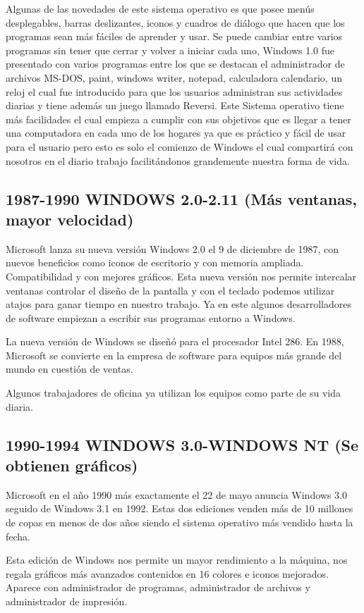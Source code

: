 Algunas de las novedades de este sistema operativo es que posee menús desplegables, barras deslizantes, iconos y cuadros de diálogo que hacen que los programas sean más 
fáciles de aprender y usar. Se puede cambiar entre varios programas sin tener que cerrar y volver a iniciar cada uno, Windows 1.0 fue presentado con varios programas entre 
los que se destacan el administrador de archivos MS-DOS, paint, windows writer, notepad, calculadora calendario, un reloj el cual fue introducido para que los usuarios 
administran sus actividades diarias y tiene además un juego  llamado Reversi. Este Sistema operativo tiene más facilidades el cual empieza a cumplir con sus objetivos que 
es llegar a tener una computadora en cada uno de los hogares ya que es práctico y fácil de usar para el usuario pero esto es solo el comienzo de Windows el cual compartirá 
con nosotros en el diario trabajo facilitándonos grandemente nuestra forma de vida.

\subsection*{1987-1990 WINDOWS 2.0-2.11 (Más ventanas, mayor velocidad)}
Microsoft lanza su nueva versión Windows 2.0 el 9 de diciembre de 1987, con nuevos beneficios como iconos de escritorio y con memoria ampliada. Compatibilidad y con mejores 
gráficos. Esta nueva versión nos permite intercalar ventanas controlar el diseño de la pantalla y con el teclado podemos utilizar atajos para ganar tiempo en nuestro 
trabajo. Ya en este algunos desarrolladores de software empiezan a escribir sus programas entorno a Windows.
 
La nueva versión de Windows se diseñó para el procesador Intel 286. En 1988, Microsoft se convierte en la empresa de software para equipos más grande del mundo en cuestión 
de ventas.
 
Algunos trabajadores de oficina ya utilizan los equipos como parte de su vida diaria.

\subsection*{1990-1994 WINDOWS 3.0-WINDOWS NT (Se obtienen gráficos)}
Microsoft en el año 1990 más exactamente el 22 de mayo  anuncia Windows 3.0 seguido de Windows 3.1 en 1992. Estas dos ediciones venden más de 10 millones de copas en menos 
de dos años siendo el sistema operativo más vendido hasta la fecha.
 
Esta edición de Windows nos permite un mayor rendimiento a la máquina, nos regala gráficos más avanzados contenidos en 16 colores e iconos mejorados. Aparece con 
administrador de programas, administrador de archivos y administrador de impresión.
 
